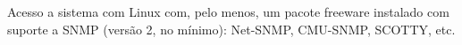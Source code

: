 \documentclass[../momento_1.tex]{subfiles}
\begin{document}
\par Acesso a sistema com Linux com, pelo menos, um pacote freeware instalado com suporte a
SNMP (versão 2, no mínimo): Net-SNMP, CMU-SNMP, SCOTTY, etc.
\end{document}
